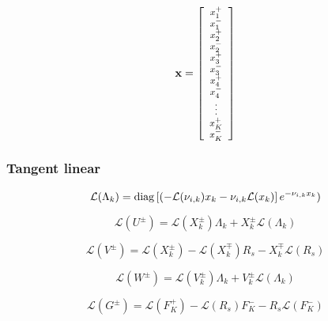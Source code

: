 \begin{equation}
\footnotesize
\mathbf{x} =
\left[
\begin{array}{c}
x^{+}_{1} \\
x^{-}_{1} \\
x^{+}_{2} \\
x^{-}_{2} \\
x^{+}_{3} \\
x^{-}_{3} \\
x^{+}_{4} \\
x^{-}_{4} \\
\vdots \\
x^{+}_{K} \\
x^{-}_{K}
\end{array}
\right]
\label{eq:eigen_bvp-forward-x}
\end{equation}


%
\subsubsection{Tangent linear}
\label{sec:dom-tangent_linear}

\begin{equation}
\mathcal{L}(\Lambda_{k}) = \mathrm{diag}\left[(-\mathcal{L}(\nu_{i,k}) x_{k} - \nu_{i,k} \mathcal{L}(x_{k})\right] e^{-\nu_{i,k} x_{k}})
\label{eq:eigen_bvp-tangent_linear-Lambda}
\end{equation}

\begin{equation}
\mathcal{L}(U^{\pm}) = \mathcal{L}(X^{\pm}_{k}) \Lambda_{k} + X^{\pm}_{k} \mathcal{L}(\Lambda_{k})
\label{eq:eigen_bvp-tangent_linear-U}
\end{equation}

\begin{equation}
\mathcal{L}(V^{\pm}) = \mathcal{L}(X^{\pm}_{k}) - \mathcal{L}(X^{\mp}_{k}) R_{s} - X^{\mp}_{k} \mathcal{L}(R_{s})
\label{eq:eigen_bvp-tangent_linear-V}
\end{equation}

\begin{equation}
\mathcal{L}(W^{\pm}) = \mathcal{L}(V^{\pm}_{k}) \Lambda_{k} + V^{\pm}_{k} \mathcal{L}(\Lambda_{k})
\label{eq:eigen_bvp-tangent_linear-W}
\end{equation}

\begin{equation}
\mathcal{L}(G^{\pm}) = \mathcal{L}(F^{+}_{K}) - \mathcal{L}(R_{s}) F^{-}_{K} - R_{s} \mathcal{L}(F^{-}_{K})
\label{eq:eigen_bvp-tangent_linear-G}
\end{equation}

